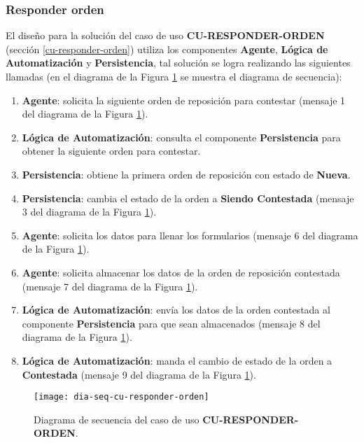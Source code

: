 \subsubsection{Responder orden}
El diseño para la solución del caso de uso \textbf{CU-RESPONDER-ORDEN} (sección \ref{cu-responder-orden}) utiliza los componentes \textbf{Agente}, \textbf{Lógica de Automatización} y \textbf{Persistencia}, tal solución se logra realizando las siguientes llamadas (en el diagrama de la Figura \ref{fig:dia-seq-cu-responder-orden} se muestra el diagrama de secuencia):
\begin{enumerate}
	\item \textbf{Agente}: solicita la siguiente orden de reposición para contestar (mensaje 1 del diagrama de la Figura \ref{fig:dia-seq-cu-responder-orden}).
	\item \textbf{Lógica de Automatización}: consulta el componente \textbf{Persistencia} para obtener la siguiente orden para contestar.
	\item \textbf{Persistencia}: obtiene la primera orden de reposición con estado de \textbf{Nueva}.
	\item \textbf{Persistencia}: cambia el estado de la orden a \textbf{Siendo Contestada} (mensaje 3 del diagrama de la Figura \ref{fig:dia-seq-cu-responder-orden}).
	\item \textbf{Agente}: solicita los datos para llenar los formularios (mensaje 6 del diagrama de la Figura \ref{fig:dia-seq-cu-responder-orden}).
	\item \textbf{Agente}: solicita almacenar los datos de la orden de reposición contestada (mensaje 7 del diagrama de la Figura \ref{fig:dia-seq-cu-responder-orden}).
	\item \textbf{Lógica de Automatización}: envía los datos de la orden contestada al componente \textbf{Persistencia} para que sean almacenados (mensaje 8 del diagrama de la Figura \ref{fig:dia-seq-cu-responder-orden}).
	\item \textbf{Lógica de Automatización}: manda el cambio de estado de la orden a \textbf{Contestada} (mensaje 9 del diagrama de la Figura \ref{fig:dia-seq-cu-responder-orden}).
\end{enumerate}

\begin{figure}[h]
	\centering
	\texttt{[image: dia-seq-cu-responder-orden]}
	\caption{Diagrama de secuencia del caso de uso \textbf{CU-RESPONDER-ORDEN}.}
	\label{fig:dia-seq-cu-responder-orden}
\end{figure}

